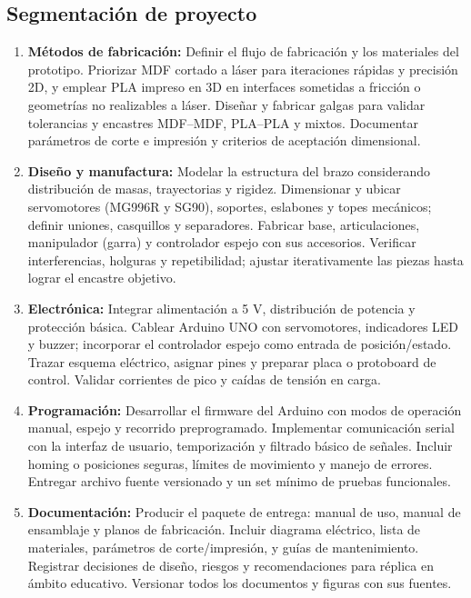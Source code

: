 \subsection{Segmentación de proyecto}
\begin{enumerate}
  \item \textbf{Métodos de fabricación:} Definir el flujo de fabricación y los materiales del prototipo. Priorizar MDF cortado a láser para iteraciones rápidas y precisión 2D, y emplear PLA impreso en 3D en interfaces sometidas a fricción o geometrías no realizables a láser. Diseñar y fabricar galgas para validar tolerancias y encastres MDF–MDF, PLA–PLA y mixtos. Documentar parámetros de corte e impresión y criterios de aceptación dimensional.
  
  \item \textbf{Diseño y manufactura:} Modelar la estructura del brazo considerando distribución de masas, trayectorias y rigidez. Dimensionar y ubicar servomotores (MG996R y SG90), soportes, eslabones y topes mecánicos; definir uniones, casquillos y separadores. Fabricar base, articulaciones, manipulador (garra) y controlador espejo con sus accesorios. Verificar interferencias, holguras y repetibilidad; ajustar iterativamente las piezas hasta lograr el encastre objetivo.
  
  \item \textbf{Electrónica:} Integrar alimentación a 5 V, distribución de potencia y protección básica. Cablear Arduino UNO con servomotores, indicadores LED y buzzer; incorporar el controlador espejo como entrada de posición/estado. Trazar esquema eléctrico, asignar pines y preparar placa o protoboard de control. Validar corrientes de pico y caídas de tensión en carga.
  
  \item \textbf{Programación:} Desarrollar el firmware del Arduino con modos de operación manual, espejo y recorrido preprogramado. Implementar comunicación serial con la interfaz de usuario, temporización y filtrado básico de señales. Incluir homing o posiciones seguras, límites de movimiento y manejo de errores. Entregar archivo fuente versionado y un set mínimo de pruebas funcionales.
  
  \item \textbf{Documentación:} Producir el paquete de entrega: manual de uso, manual de ensamblaje y planos de fabricación. Incluir diagrama eléctrico, lista de materiales, parámetros de corte/impresión, y guías de mantenimiento. Registrar decisiones de diseño, riesgos y recomendaciones para réplica en ámbito educativo. Versionar todos los documentos y figuras con sus fuentes.
 
\end{enumerate}

